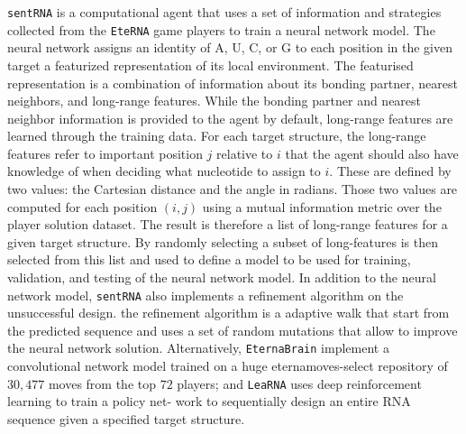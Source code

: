 \texttt{sentRNA} \cite{shi2018sentrna} is a computational agent that uses a set of information and strategies collected from the \texttt{EteRNA} game players to train a neural network model. The neural network assigns an identity of A, U, C, or G to each position in the given target a featurized representation of its local environment. The featurised representation is a combination of information about its bonding partner, nearest neighbors, and long-range features. While the bonding partner and nearest neighbor information is provided to the agent by default, long-range features are learned through the training data. For each target structure, the long-range features refer to important position $j$ relative to $i$ that the agent should also have knowledge of when deciding what nucleotide to assign to $i$. These are defined by two values: the Cartesian distance and the angle in radians. Those two values are computed for each position $(i,j)$ using a mutual information metric over the player solution dataset. The result is therefore a list of long-range features for a given target structure.  By randomly selecting a subset of long-features is then selected from this list and used to define a model to be used for training, validation, and testing of the neural network model.  In addition to the neural network model, \texttt{sentRNA} also implements a refinement algorithm on the unsuccessful design. the refinement algorithm is a adaptive walk that start from the predicted sequence and uses a set of random mutations that allow to improve the neural network solution. Alternatively, \texttt{EternaBrain} \cite{koodli2019eternabrain} implement a convolutional network model trained on a huge eternamoves-select repository of $30,477$ moves from the top $72$ players; and \texttt{LeaRNA}\cite{runge2018learning} uses deep reinforcement learning to train a policy net-
work to sequentially design an entire RNA sequence given a specified target structure.

